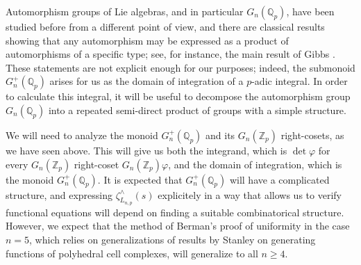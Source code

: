 \documentclass[12pt]{article}
\begin{document}
Automorphism groups of Lie algebras, and in particular $G_{n}(\mathbb{Q}_{p})$, have been studied before from a different point of view, and there are classical results showing that any automorphism may be expressed as a product of automorphisms of a specific type; see, for instance, the main result of Gibbs \cite{Gibbs}.  These statements are not explicit enough for our purposes; indeed, the submonoid $G_{n}^{+}(\mathbb{Q}_p)$ arises for us as the domain of integration of a $p$-adic integral.  In order to calculate this integral, it will be useful to decompose the automorphism group $G_{n}(\mathbb{Q}_p)$ into a repeated semi-direct product of groups with a simple structure.
\par
We will need to analyze the monoid $G_{n}^{+}(\mathbb{Q}_p)$ and its $G_{n}(\mathbb{Z}_p)$ right-cosets, as we have seen above. This will give us both the integrand, which is $\det\varphi$ for every $G_{n}(\mathbb{Z}_p)$ right-coset $G_{n}(\mathbb{Z}_p)\varphi$, and the domain of integration, which is the monoid $G_{n}^{+}(\mathbb{Q}_p)$. It is expected that $G_{n}^{+}(\mathbb{Q}_{p})$ will have a complicated structure, and expressing $\zeta_{L_{n,p}}^{\wedge}(s)$ explicitely in a way that allows us to verify functional equations will depend on finding a suitable combinatorical structure. However, we expect that the method of Berman's proof of uniformity in the case $n=5$, which relies on generalizations of results by Stanley on generating functions of polyhedral cell complexes, will generalize to all $n\geq{4}$.
\end{document}
